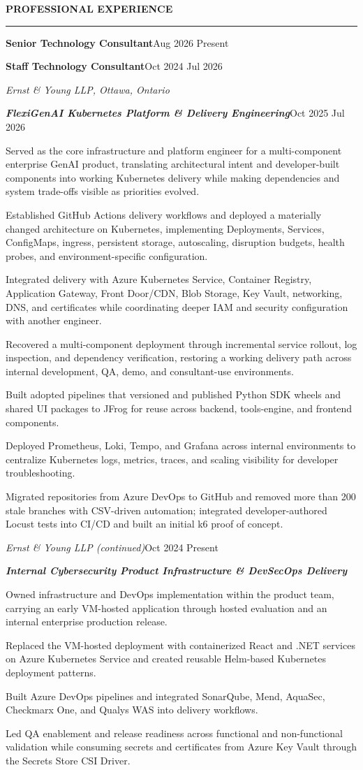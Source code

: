\documentclass[11pt]{article}
\newcommand{\TwoColLine}[2]{\noindent #1\hfill #2\par}
\newcommand{\ResumeSection}[1]{\vspace{5pt}\begin{center}\textbf{\MakeUppercase{#1}}\\[-4pt]\rule{0.98\textwidth}{0.6pt}\end{center}\vspace{1pt}}
\newcommand{\RoleLine}[2]{\TwoColLine{\textbf{#1}}{#2}}
\newcommand{\OrgLine}[1]{\noindent\textit{#1}\par}
\newcommand{\OrgContinuationLine}[2]{\TwoColLine{\textit{#1}}{#2}}
\newcommand{\ContextLine}[1]{\noindent\textbf{\textit{#1}}\par}
\newcommand{\RoleSummary}[1]{\vspace{1pt}\noindent #1\par\vspace{1pt}}
\newcommand{\EngineeringWorkLabel}{\vspace{1pt}}
\newlength{\BulletIndent}
\newenvironment{ResumeItems}{\begin{list}{\textbullet}{\setlength{\leftmargin}{\BulletIndent}\setlength{\labelwidth}{0.8em}\setlength{\labelsep}{0.5em}\setlength{\itemindent}{0pt}\setlength{\itemsep}{0.5pt}\setlength{\parsep}{0pt}\setlength{\topsep}{0pt}\setlength{\partopsep}{0pt}}}{\par\end{list}}
\newcommand{\PB}[1]{\par\item #1}
\begin{document}
\ResumeSection{Professional Experience}
\RoleLine{Senior Technology Consultant}{Aug 2026 \textendash{} Present}
\RoleLine{Staff Technology Consultant}{Oct 2024 \textendash{} Jul 2026}
\OrgLine{Ernst \& Young LLP, Ottawa, Ontario}
\TwoColLine{\textbf{\textit{FlexiGenAI \textemdash{} Kubernetes Platform \& Delivery Engineering}}}{Oct 2025 \textendash{} Jul 2026}
\RoleSummary{Served as the core infrastructure and platform engineer for a
multi-component enterprise GenAI product, translating architectural intent and
developer-built components into working Kubernetes delivery while making
dependencies and system trade-offs visible as priorities evolved.}
\EngineeringWorkLabel
\begin{ResumeItems}
\PB{Established GitHub Actions delivery workflows and deployed a materially changed architecture on Kubernetes, implementing Deployments, Services, ConfigMaps, ingress, persistent storage, autoscaling, disruption budgets, health probes, and environment-specific configuration.}
\PB{Integrated delivery with Azure Kubernetes Service, Container Registry, Application Gateway, Front Door/CDN, Blob Storage, Key Vault, networking, DNS, and certificates while coordinating deeper IAM and security configuration with another engineer.}
\PB{Recovered a multi-component deployment through incremental service rollout, log inspection, and dependency verification, restoring a working delivery path across internal development, QA, demo, and consultant-use environments.}
\PB{Built adopted pipelines that versioned and published Python SDK wheels and shared UI packages to JFrog for reuse across backend, tools-engine, and frontend components.}
\PB{Deployed Prometheus, Loki, Tempo, and Grafana across internal environments to centralize Kubernetes logs, metrics, traces, and scaling visibility for developer troubleshooting.}
\PB{Migrated repositories from Azure DevOps to GitHub and removed more than 200 stale branches with CSV-driven automation; integrated developer-authored Locust tests into CI/CD and built an initial k6 proof of concept.}
\end{ResumeItems}

\newpage
\OrgContinuationLine{Ernst \& Young LLP (continued)}{Oct 2024 \textendash{} Present}
\ContextLine{Internal Cybersecurity Product \textemdash{} Infrastructure \& DevSecOps Delivery}
\RoleSummary{Owned infrastructure and DevOps implementation within the product
team, carrying an early VM-hosted application through hosted evaluation and an
internal enterprise production release.}
\EngineeringWorkLabel
\begin{ResumeItems}
\PB{Replaced the VM-hosted deployment with containerized React and .NET services on Azure Kubernetes Service and created reusable Helm-based Kubernetes deployment patterns.}
\PB{Built Azure DevOps pipelines and integrated SonarQube, Mend, AquaSec, Checkmarx One, and Qualys WAS into delivery workflows.}
\PB{Led QA enablement and release readiness across functional and non-functional validation while consuming secrets and certificates from Azure Key Vault through the Secrets Store CSI Driver.}
\end{ResumeItems}
\end{document}
